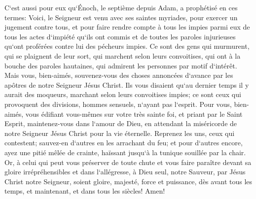 \verse C`est aussi pour eux qu`Énoch, le septième depuis Adam, a prophétisé en ces termes: Voici, le Seigneur est venu avec ses saintes myriades, 
\verse pour exercer un jugement contre tous, et pour faire rendre compte à tous les impies parmi eux de tous les actes d`impiété qu`ils ont commis et de toutes les paroles injurieuses qu`ont proférées contre lui des pécheurs impies. 
\verse Ce sont des gens qui murmurent, qui se plaignent de leur sort, qui marchent selon leurs convoitises, qui ont à la bouche des paroles hautaines, qui admirent les personnes par motif d`intérêt. 
\verse Mais vous, bien-aimés, souvenez-vous des choses annoncées d`avance par les apôtres de notre Seigneur Jésus Christ. 
\verse Ils vous disaient qu`au dernier temps il y aurait des moqueurs, marchant selon leurs convoitises impies; 
\verse ce sont ceux qui provoquent des divisions, hommes sensuels, n`ayant pas l`esprit. 
\verse Pour vous, bien-aimés, vous édifiant vous-mêmes sur votre très sainte foi, et priant par le Saint Esprit, 
\verse maintenez-vous dans l`amour de Dieu, en attendant la miséricorde de notre Seigneur Jésus Christ pour la vie éternelle. 
\verse Reprenez les uns, ceux qui contestent; 
\verse sauvez-en d`autres en les arrachant du feu; et pour d`autres encore, ayez une pitié mêlée de crainte, haïssant jusqu`à la tunique souillée par la chair. 
\verse Or, à celui qui peut vous préserver de toute chute et vous faire paraître devant sa gloire irrépréhensibles et dans l`allégresse, 
\verse à Dieu seul, notre Sauveur, par Jésus Christ notre Seigneur, soient gloire, majesté, force et puissance, dès avant tous les temps, et maintenant, et dans tous les siècles! Amen! 
